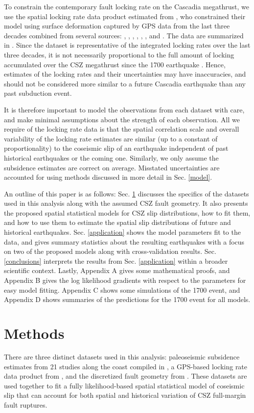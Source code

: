 {To constrain the contemporary fault locking rate on the Cascadia megathrust, we use the spatial locking rate data product estimated from \citep{pollitz2017}, who constrained their model using surface deformation captured by GPS data from the last three decades combined from several sources: \citet{GPS1}, \citet{GPS2}, \citet{GPS3}, \citet{GPS4}, \citet{GPS5}, \citet{GPS6}, and \citet{GPS7}.  The data are summarized in \citet{evans2015}.  Since the dataset is representative of the integrated locking rates over the last three decades, it is not necessarily proportional to the full amount of locking accumulated over the CSZ megathrust since the 1700 earthquake \citep{wang2012}.  Hence, estimates of the locking rates and their uncertainties may have inaccuracies, and should not be considered more similar to a future Cascadia earthquake than any past subduction event.

It is therefore important to model the observations from each dataset with care, and make minimal assumptions about the strength of each observation.  All we require of the locking rate data is that the spatial correlation scale and overall variability of the locking rate estimates are similar (up to a constant of proportionality) to the coseismic slip of an earthquake independent of past historical earthquakes or the coming one.   Similarly, we only assume the subsidence estimates are correct on average.  Misstated uncertainties are accounted for using methods discussed in more detail in Sec. \ref{model}.

An outline of this paper is as follows: Sec. \ref{methods} discusses the specifics of the datasets used in this analysis along with the assumed CSZ fault geometry.  It also presents the proposed spatial statistical models for CSZ slip distributions, how to fit them, and how to use them to estimate the spatial slip distributions of future and historical earthquakes.  Sec. \ref{application} shows the model parameters fit to the data, and gives summary statistics about the resulting earthquakes with a focus on two of the proposed models along with cross-validation results.  Sec. \ref{conclusions} interprets the results from Sec. \ref{application} within a broader scientific context.  Lastly, Appendix A gives some mathematical proofs, and Appendix B gives the log likelihood gradients with respect to the parameters for easy model fitting.  Appendix C shows some simulations of the 1700 event, and Appendix D shows summaries of the predictions for the 1700 event for all models.

\section{Methods}
\label{methods}
There are three distinct datasets used in this analysis: paleoseismic subsidence estimates from 21 studies along the coast compiled in \citet{leonard2010}, a GPS-based locking rate data product from \citet{pollitz2017}, and the discretized fault geometry from \citet{faultGeom}.  These datasets are used together to fit a fully likelihood-based spatial statistical model of coseismic slip that can account for both spatial and historical variation of CSZ full-margin fault ruptures.

}
